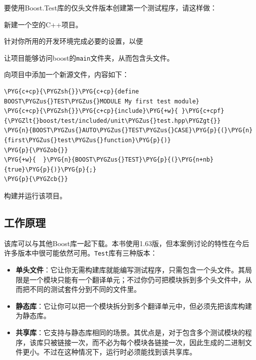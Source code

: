 要使用Boost.Test库的仅头文件版本创建第一个测试程序，请这样做：



新建一个空的C++项目。



针对你所用的开发环境完成必要的设置，以便



让项目能够访问boost的\texttt{main}文件夹，从而包含头文件。



向项目中添加一个新源文件，内容如下：



\begin{codeblockbg}
\begin{Verbatim}[commandchars=\\\{\},breaklines=true,breakanywhere=true,fontsize=\codefont,xleftmargin=17bp]
\PYG{c+cp}{\PYGZsh{}}\PYG{c+cp}{define BOOST\PYGZus{}TEST\PYGZus{}MODULE My first test module}
\PYG{c+cp}{\PYGZsh{}}\PYG{c+cp}{include}\PYG{+w}{ }\PYG{c+cpf}{\PYGZlt{}boost/test/included/unit\PYGZus{}test.hpp\PYGZgt{}}
\PYG{n}{BOOST\PYGZus{}AUTO\PYGZus{}TEST\PYGZus{}CASE}\PYG{p}{(}\PYG{n}{first\PYGZus{}test\PYGZus{}function}\PYG{p}{)}
\PYG{p}{\PYGZob{}}
\PYG{+w}{  }\PYG{n}{BOOST\PYGZus{}TEST}\PYG{p}{(}\PYG{n+nb}{true}\PYG{p}{)}\PYG{p}{;}
\PYG{p}{\PYGZcb{}}
\end{Verbatim}
\end{codeblockbg}



构建并运行该项目。



\subsection{工作原理}



该库可以与其他Boost库一起下载。本书使用1.63版，但本案例讨论的特性在今后许多版本中很可能依然可用。\texttt{Test}库有三种版本：



\begin{itemize}
\item \textbf{单头文件}：它让你无需构建库就能编写测试程序，只需包含一个头文件。其局限是一个模块只能有一个翻译单元；不过你仍可把模块拆到多个头文件中，从而把不同的测试套件分到不同的文件里。



\item \textbf{静态库}：它让你可以把一个模块拆分到多个翻译单元中，但必须先把该库构建为静态库。



\item \textbf{共享库}：它支持与静态库相同的场景。其优点是，对于包含多个测试模块的程序，该库只被链接一次，而不必为每个模块各链接一次，因此生成的二进制文件更小。不过在这种情况下，运行时必须能找到该共享库。


\end{itemize}


